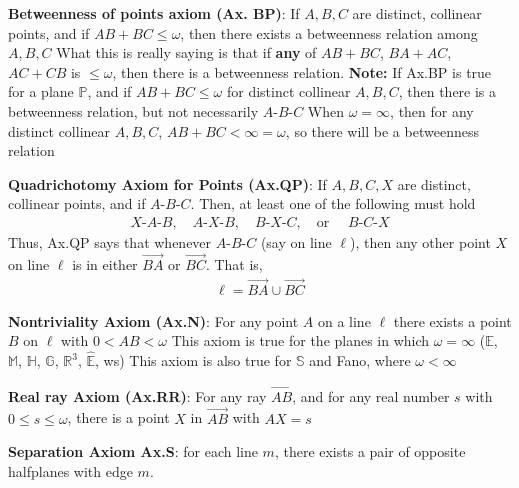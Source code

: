 \documentclass{report}
\begin{document}
    \item \textbf{Betweenness of points axiom (Ax. BP)}: If $A,B,C$ are distinct, collinear points, and if $AB + BC \leq \omega$, then there exists a betweenness relation among $A,B,C$
        \bigbreak \noindent 
        What this is really saying is that if \textbf{any} of $AB + BC$, $BA + AC$, $AC + CB$ is $ \leq \omega$, then there is a betweenness relation.
        \bigbreak \noindent 
        \textbf{Note:} If Ax.BP is true for a plane $\mathbb{P}$, and if $AB + BC \leq \omega$ for distinct collinear $A,B,C$, then there is a betweenness relation, but not necessarily $ A\text{-}B\text{-}C $
        \bigbreak \noindent 
        When $\omega = \infty$, then for any distinct collinear $A,B,C$, $AB +BC  < \infty = \omega $, so there will be a betweenness relation
    \item \textbf{Quadrichotomy Axiom for Points (Ax.QP)}: If $A,B,C,X$ are distinct, collinear points, and if $ A\text{-}B\text{-}C$. Then, at least one of the following must hold
        \begin{align*}
            X\text{-}A\text{-}B, \quad A\text{-}X\text{-}B, \quad B\text{-}X\text{-}C, \quad \text{or } \quad B\text{-}C\text{-}X
        \end{align*}
        \bigbreak \noindent 
        Thus, Ax.QP says that whenever $ A\text{-}B\text{-}C$ (say on line $\ell$), then any other point $X$ on line $\ell$ is in either $ \overrightarrow{BA} $ or $ \overrightarrow{BC} $. That is,
        \begin{align*}
            \ell = \overrightarrow{BA} \cup \overrightarrow{BC}
        \end{align*}

    \item \textbf{Nontriviality Axiom (Ax.N)}: For any point $A$ on a line $\ell$ there exists a point $B$ on $\ell$ with $0 < AB < \omega$
        \bigbreak \noindent 
        This axiom is true for the planes in which $\omega = \infty$ ($\mathbb{E}$, $\mathbb{M}$, $\mathbb{H}$, $\mathbb{G}$, $\mathbb{R}^{3}$, $\hat{\mathbb{E}} $, ws)
        \bigbreak \noindent 
        This axiom is also true for $\mathbb{S}$ and Fano, where $\omega < \infty $
     \item \textbf{Real ray Axiom (Ax.RR)}: For any ray $ \overrightarrow{AB}$, and for any real number $s $ with $0 \leq s \leq \omega$, there is a point $X$ in $\overrightarrow{AB}$ with $AX = s$
        \item \textbf{Separation Axiom Ax.S}: for each line $m$, there exists a pair of opposite halfplanes with edge $m$. 
\end{document}
